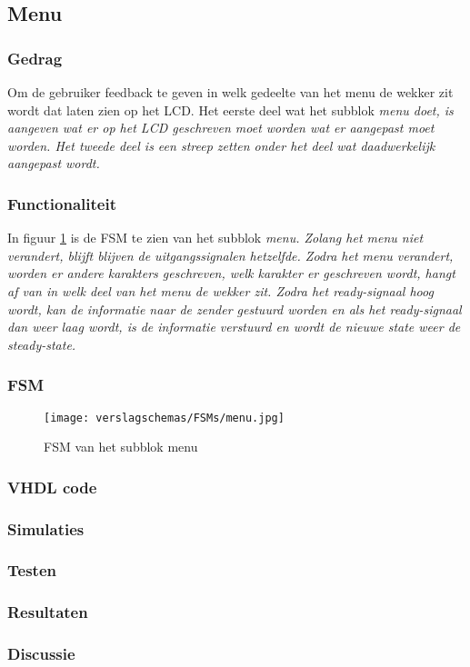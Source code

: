 \subsection{Menu}

\subsubsection{Gedrag}
Om de gebruiker feedback te geven in welk gedeelte van het menu de wekker zit wordt dat laten zien op het LCD. Het eerste deel wat het subblok \it{menu} doet, is aangeven wat er op het LCD geschreven moet worden wat er aangepast moet worden. Het tweede deel is een streep zetten onder het deel wat daadwerkelijk aangepast wordt.

\subsubsection{Functionaliteit}
In figuur \ref{fig:FSMmenu} is de FSM te zien van het subblok \it{menu}. Zolang het menu niet verandert, blijft blijven de uitgangssignalen hetzelfde. Zodra het menu verandert, worden er andere karakters geschreven, welk karakter er geschreven wordt, hangt af van in welk deel van het menu de wekker zit. Zodra het ready-signaal hoog wordt, kan de informatie naar de zender gestuurd worden en als het ready-signaal dan weer laag wordt, is de informatie verstuurd en wordt de nieuwe state weer de steady-state.

\subsubsection{FSM}

\begin{figure}[h!]
\texttt{[image: verslagschemas/FSMs/menu.jpg]}
\caption{FSM van het subblok menu}
\label{fig:FSMmenu}
\end{figure}


\subsubsection{VHDL code}

\subsubsection{Simulaties}

\subsubsection{Testen}

\subsubsection{Resultaten}

\subsubsection{Discussie}